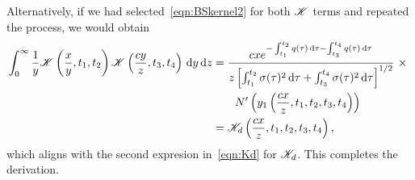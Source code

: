 Alternatively, if we had selected~\eqref{eqn:BSkernel2} for both $\mathscr K$ terms and repeated the process, we would obtain
	\begin{align*}
		\int_0^\infty \frac{1}{y}\mathscr K\left(\frac{x}{y},t_1,t_2\right)\mathscr K\left( \frac{cy}{z},t_3,t_4 \right) \, \mathrm d y \, \mathrm d z &=  \frac{cxe^{-\int_{t_1}^{t_2} q(\tau) \,\mathrm d\tau - \int_{t_3}^{t_4} q(\tau) \,\mathrm d\tau}}{z\left[ \int_{t_1}^{t_2} \sigma(\tau)^2 \,\mathrm d\tau + \int_{t_3}^{t_4} \sigma(\tau)^2 \,\mathrm d\tau \right]^{1/2}} \ \times \ \\
		&\qquad N'\left( y_1\left(\frac{cx}{z}, t_1, t_2, t_3, t_4 \right)\right) \\
		&= \mathscr K_d\left(  \frac{cx}{z}, t_1, t_2, t_3, t_4 \right),
	\end{align*}
which aligns with the second expresion in~\eqref{eqn:Kd} for $\mathscr K_d$. This completes the derivation.

